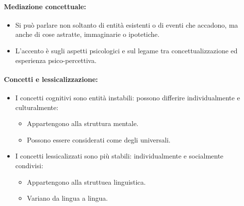 
\paragraph{Mediazione concettuale:}

\begin{itemize}
  \item Si può parlare non soltanto di entità esistenti o di eventi che accadono, ma anche di cose astratte, immaginarie o ipotetiche. 
  \item L'accento è sugli aspetti psicologici e sul legame tra concettualizzazione ed esperienza psico-percettiva.
\end{itemize}

\paragraph{Concetti e lessicalizzazione:}

\begin{itemize}
  \item I concetti cognitivi sono entità instabili: possono differire individualmente e culturalmente: 
    \begin{itemize}
      \item Appartengono alla struttura mentale. 
      \item Possono essere considerati come degli universali.
    \end{itemize}
  \item I concetti lessicalizzati sono più stabili: individualmente e socialmente condivisi: 
    \begin{itemize}
      \item Appartengono alla struttuea linguistica. 
      \item Variano da lingua a lingua.
    \end{itemize}
\end{itemize}


